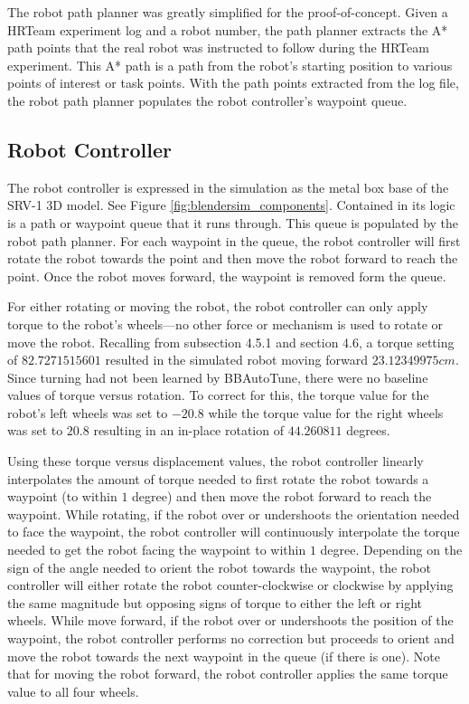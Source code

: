 The robot path planner was greatly simplified for the proof-of-concept. Given a HRTeam experiment log and a robot number, the path planner extracts the A* path points that the real robot was instructed to follow during the HRTeam experiment. This A* path is a path from the robot's starting position to various points of interest or task points. With the path points extracted from the log file, the robot path planner populates the robot controller's waypoint queue. 

\subsection{Robot Controller}


The robot controller is expressed in the simulation as the metal box base of the SRV-1 3D model. See Figure \ref{fig:blendersim_components}. Contained in its logic is a path or waypoint queue that it runs through. This queue is populated by the robot path planner. For each waypoint in the queue, the robot controller will first rotate the robot towards the point and then move the robot forward to reach the point. Once the robot moves forward, the waypoint is removed form the queue. 

For either rotating or moving the robot, the robot controller can only apply torque to the robot's wheels---no other force or mechanism is used to rotate or move the robot. Recalling from subsection 4.5.1 and section 4.6, a torque setting of $82.7271515601$ resulted in the simulated robot moving forward $23.12349975cm$. Since turning had not been learned by BBAutoTune, there were no baseline values of torque versus rotation. To correct for this, the torque value for the robot's left wheels was set to $-20.8$ while the torque value for the right wheels was set to $20.8$ resulting in an in-place rotation of $44.260811$ degrees. 

Using these torque versus displacement values, the robot controller linearly interpolates the amount of torque needed to first rotate the robot towards a waypoint (to within $1$ degree) and then move the robot forward to reach the waypoint. While rotating, if the robot over or undershoots the orientation needed to face the waypoint, the robot controller will continuously interpolate the torque needed to get the robot facing the waypoint to within $1$ degree. Depending on the sign of the angle needed to orient the robot towards the waypoint, the robot controller will either rotate the robot counter-clockwise or clockwise by applying the same magnitude but opposing signs of torque to either the left or right wheels. While move forward, if the robot over or undershoots the position of the waypoint, the robot controller performs no correction but proceeds to orient and move the robot towards the next waypoint in the queue (if there is one). Note that for moving the robot forward, the robot controller applies the same torque value to all four wheels.   

